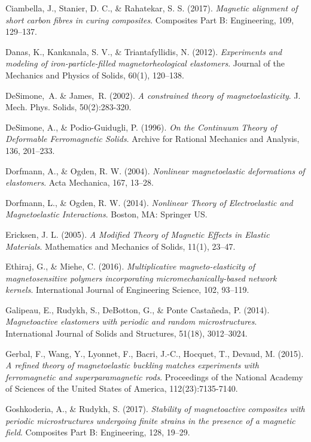 \documentclass[oneside]{article}
\begin{document}
\begin{thebibliography}{9}
				 Ciambella, J., Stanier, D. C., \& Rahatekar, S. S. (2017). \textit{Magnetic alignment of short carbon fibres in curing composites}. Composites Part B: Engineering, 109, 129--137. 
				
				 Danas, K., Kankanala, S. V., \& Triantafyllidis, N. (2012). \textit{Experiments and modeling of iron-particle-filled magnetorheological elastomers}. Journal of the Mechanics and Physics of Solids, 60(1), 120--138. 
				
				 DeSimone,~A. \& James,~R. (2002). \textit{A constrained theory of magnetoelasticity}. J. Mech. Phys. Solids, 50(2):283-320.
				
				 DeSimone, A., \& Podio-Guidugli, P. (1996). \textit{On the Continuum Theory of Deformable Ferromagnetic Solids}. Archive for Rational Mechanics and Analysis, 136, 201--233.
				
				 Dorfmann, A., \& Ogden, R. W. (2004). \textit{Nonlinear magnetoelastic deformations of elastomers}. Acta Mechanica, 167, 13--28.
				
				 Dorfmann, L., \& Ogden, R. W. (2014). \textit{Nonlinear Theory of Electroelastic and Magnetoelastic Interactions}. Boston, MA: Springer US.
				
				 Ericksen, J. L. (2005). \textit{A Modified Theory of Magnetic Effects in Elastic Materials}. Mathematics and Mechanics of Solids, 11(1), 23--47.
				
				 Ethiraj, G., \& Miehe, C. (2016). \textit{Multiplicative magneto-elasticity of magnetosensitive polymers incorporating micromechanically-based network kernels}. International Journal of Engineering Science, 102, 93--119. 
				
				 Galipeau, E., Rudykh, S., DeBotton, G., \& Ponte Casta{\~n}eda, P. (2014).\textit{ Magnetoactive elastomers with periodic and random microstructures}. International Journal of Solids and Structures, 51(18), 3012--3024.
				
				 Gerbal, F., Wang, Y., Lyonnet, F., Bacri, J.-C., Hocquet, T., Devaud, M. (2015). \textit{A refined theory of magnetoelastic buckling matches experiments with ferromagnetic and superparamagnetic rods}. Proceedings of the National Academy of Sciences of the United States of America, 112(23):7135-7140.
				
				 Goshkoderia, A., \& Rudykh, S. (2017). \textit{Stability of magnetoactive composites with periodic microstructures undergoing finite strains in the presence of a magnetic field}. Composites Part B: Engineering, 128, 19--29.
				

\end{thebibliography}
\end{document}

